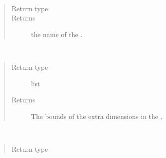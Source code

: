 \documentclass[letterpaper,10pt,english]{sphinxmanual}
\begin{document}
\begin{fulllineitems}

\begin{fulllineitems}
\label{\detokenize{field:ESMF.api.field.Field.name}}~\begin{quote}\begin{description}
\item[{Return type}] \leavevmode
{}

\item[{Returns}] \leavevmode
the name of the {\hyperref[\detokenize{field:ESMF.api.field.Field}]{}}.

\end{description}\end{quote}

\end{fulllineitems}


\begin{fulllineitems}
\label{\detokenize{field:ESMF.api.field.Field.ndbounds}}~\begin{quote}\begin{description}
\item[{Return type}] \leavevmode
list

\item[{Returns}] \leavevmode
The bounds of the extra dimensions in the
{\hyperref[\detokenize{field:ESMF.api.field.Field}]{}}.

\end{description}\end{quote}

\end{fulllineitems}


\begin{fulllineitems}
\label{\detokenize{field:ESMF.api.field.Field.rank}}~\begin{quote}\begin{description}
\item[{Return type}] \leavevmode
{}


\end{description}
\end{quote}
\end{fulllineitems}
\end{fulllineitems}
\end{document}
